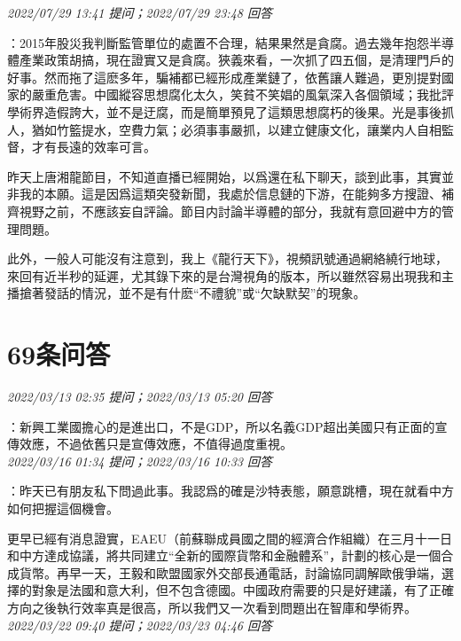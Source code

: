 \documentclass[twocolumn]{ctexart}
\begin{document}
\textit{\hfill\noindent\small 2022/07/29 13:41 提问；2022/07/29 23:48 回答}

：2015年股災我判斷監管單位的處置不合理，結果果然是貪腐。過去幾年抱怨半導體產業政策胡搞，現在證實又是貪腐。狹義來看，一次抓了四五個，是清理門戶的好事。然而拖了這麽多年，騙補都已經形成產業鏈了，依舊讓人難過，更別提對國家的嚴重危害。中國縱容思想腐化太久，笑貧不笑娼的風氣深入各個領域；我批評學術界造假誇大，並不是迂腐，而是簡單預見了這類思想腐朽的後果。光是事後抓人，猶如竹籃提水，空費力氣；必須事事嚴抓，以建立健康文化，讓業内人自相監督，才有長遠的效率可言。

昨天上唐湘龍節目，不知道直播已經開始，以爲還在私下聊天，談到此事，其實並非我的本願。這是因爲這類突發新聞，我處於信息鏈的下游，在能夠多方搜證、補齊視野之前，不應該妄自評論。節目内討論半導體的部分，我就有意回避中方的管理問題。

此外，一般人可能沒有注意到，我上《龍行天下》，視頻訊號通過網絡繞行地球，來回有近半秒的延遲，尤其錄下來的是台灣視角的版本，所以雖然容易出現我和主播搶著發話的情況，並不是有什麽“不禮貌”或“欠缺默契”的現象。
\\

\section{69条问答}

\textit{\hfill\noindent\small 2022/03/13 02:35 提问；2022/03/13 05:20 回答}

：新興工業國擔心的是進出口，不是GDP，所以名義GDP超出美國只有正面的宣傳效應，不過依舊只是宣傳效應，不值得過度重視。
\\

\textit{\hfill\noindent\small 2022/03/16 01:34 提问；2022/03/16 10:33 回答}

：昨天已有朋友私下問過此事。我認爲的確是沙特表態，願意跳槽，現在就看中方如何把握這個機會。

更早已經有消息證實，EAEU（前蘇聯成員國之間的經濟合作組織）在三月十一日和中方達成協議，將共同建立“全新的國際貨幣和金融體系”，計劃的核心是一個合成貨幣。再早一天，王毅和歐盟國家外交部長通電話，討論協同調解歐俄爭端，選擇的對象是法國和意大利，但不包含德國。中國政府需要的只是好建議，有了正確方向之後執行效率真是很高，所以我們又一次看到問題出在智庫和學術界。
\\

\textit{\hfill\noindent\small 2022/03/22 09:40 提问；2022/03/23 04:46 回答}
\end{document}
